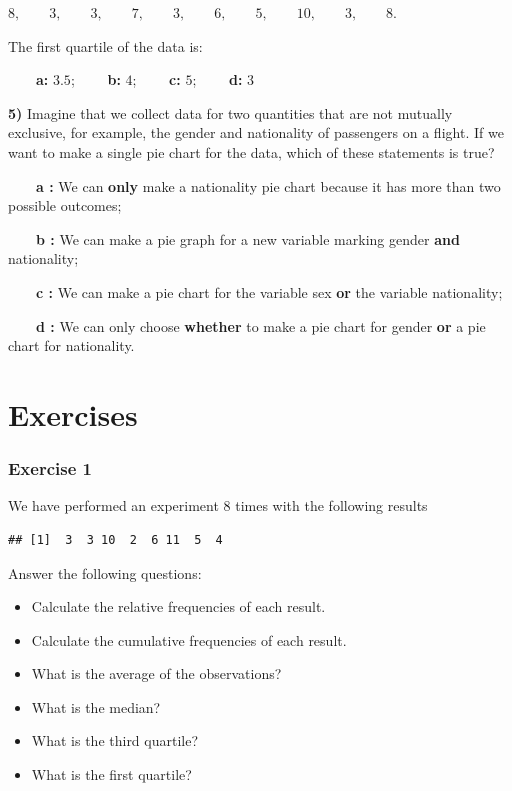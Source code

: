 \documentclass[
]{book}
\providecommand{\tightlist}{%
  \setlength{\itemsep}{0pt}\setlength{\parskip}{0pt}}
\begin{document}
\(8, \qquad 3, \qquad 3, \qquad 7, \qquad 3, \qquad 6, \qquad 5, \qquad 10, \qquad 3, \qquad 8\).

The first quartile of the data is:

\textbf{\(\qquad\)a:} \(3.5\); \textbf{\(\qquad\)b:} \(4\); \textbf{\(\qquad\)c:} \(5\); \textbf{\(\qquad\)d:} \(3\)

\textbf{5)} Imagine that we collect data for two quantities that are not mutually exclusive, for example, the gender and nationality of passengers on a flight. If we want to make a single pie chart for the data, which of these statements is true?

\textbf{\(\qquad\)a :} We can \textbf{only} make a nationality pie chart because it has more than two possible outcomes;

\textbf{\(\qquad\)b :} We can make a pie graph for a new variable marking gender \textbf{and} nationality;

\textbf{\(\qquad\)c :} We can make a pie chart for the variable sex \textbf{or} the variable nationality;

\textbf{\(\qquad\)d :} We can only choose \textbf{whether} to make a pie chart for gender \textbf{or} a pie chart for nationality.

\hypertarget{exercises}{%
\section{Exercises}\label{exercises}}

\hypertarget{exercise-1}{%
\subsubsection{Exercise 1}\label{exercise-1}}

We have performed an experiment 8 times with the following results

\begin{verbatim}
## [1]  3  3 10  2  6 11  5  4
\end{verbatim}

Answer the following questions:

\begin{itemize}
\tightlist
\item
  Calculate the relative frequencies of each result.
\item
  Calculate the cumulative frequencies of each result.
\item
  What is the average of the observations?
\item
  What is the median?
\item
  What is the third quartile?
\item
  What is the first quartile?
\end{itemize}
\end{document}
